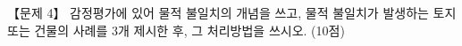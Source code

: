 \begin{longquestion}{【문제 4】}
감정평가에 있어 물적 불일치의 개념을 쓰고, 물적 불일치가 발생하는 토지 또는 건물의 사례를 3개 제시한 후, 그 처리방법을 쓰시오. (10점) \par
\end{longquestion}
